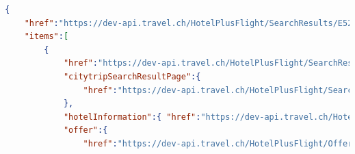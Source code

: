 \begin{lstlisting}[language=json,firstnumber=1]
{
    "href":"https://dev-api.travel.ch/HotelPlusFlight/SearchResults/E5241069-1272-4DD0-946E-46DD2E9D55E6",
    "items":[
        {
            "href":"https://dev-api.travel.ch/HotelPlusFlight/SearchResult/21ca65ff-976a-4a3e-bc92-b17608db3b25?pageId=58B8D81D-12B5-4EEE-9CE9-902CCDF01791",
            "citytripSearchResultPage":{
                "href":"https://dev-api.travel.ch/HotelPlusFlight/SearchResultPage/19E2B6BB-1F06-4396-B86E-169EDB368B0E?paging.offset=0&paging.size=12&sortMethod.type=https%3A%2F%2Fdev-api.travel.ch%2FSortType%2FPrice&ratings.minimal=0&ratings.maximal=100&hotelCategories%5B0%5D=https%3A%2F%2Fdev-api.travel.ch%2FHotelCategory%2FNone&hotelCategories%5B1%5D=https%3A%2F%2Fdev-api.travel.ch%2FHotelCategory%2FOne&hotelCategories%5B2%5D=https%3A%2F%2Fdev-api.travel.ch%2FHotelCategory%2FTwo&hotelCategories%5B3%5D=https%3A%2F%2Fdev-api.travel.ch%2FHotelCategory%2FThree&hotelCategories%5B4%5D=https%3A%2F%2Fdev-api.travel.ch%2FHotelCategory%2FFour&hotelCategories%5B5%5D=https%3A%2F%2Fdev-api.travel.ch%2FHotelCategory%2FFive&mealTypeCategories%5B0%5D=https%3A%2F%2Fdev-api.travel.ch%2FHotelMealTypeCategory%2FRoomOnly&mealTypeCategories%5B1%5D=https%3A%2F%2Fdev-api.travel.ch%2FHotelMealTypeCategory%2FBreakfast&mealTypeCategories%5B2%5D=https%3A%2F%2Fdev-api.travel.ch%2FHotelMealTypeCategory%2FHalfBoard&mealTypeCategories%5B3%5D=https%3A%2F%2Fdev-api.travel.ch%2FHotelMealTypeCategory%2FFullBoard&mealTypeCategories%5B4%5D=https%3A%2F%2Fdev-api.travel.ch%2FHotelMealTypeCategory%2FAllInclusive&luggageOptions%5B0%5D=https%3A%2F%2Fdev-api.travel.ch%2FLuggageOption%2FWithLuggage&luggageOptions%5B1%5D=https%3A%2F%2Fdev-api.travel.ch%2FLuggageOption%2FWithoutLuggage"
            },
            "hotelInformation":{ "href":"https://dev-api.travel.ch/HotelInformation/DDA48396-8105-433D-B75B-668F96EC89D8" },
            "offer":{
                "href":"https://dev-api.travel.ch/HotelPlusFlight/Offer?destination=https%3A%2F%2Fdev-api.travel.ch%2FDestination%2FH_63CA0931EAD8A33EF988144360A8056C&offerHotelInformation=https%3A%2F%2Fdev-api.travel.ch%2FHotelInformation%2FDDA48396-8105-433D-B75B-668F96EC89D8&hotelInformation=https%3A%2F%2Fdev-api.travel.ch%2FHotelInformation%2FDDA48396-8105-433D-B75B-668F96EC89D8&periodOfStay.checkInDate=2016-10-05&periodOfStay.checkOutDate=2016-10-08&roomOccupancies%5B0%5D.dateOfBirths%5B0%5D=null&roomOccupancies%5B0%5D.dateOfBirths%5B1%5D=null&departureAirports%5B0%5D=https%3A%2F%2Fdev-api.travel.ch%2FDestination%2FA6299722&mealTypeCategories%5B0%5D=https%3A%2F%2Fdev-api.travel.ch%2FHotelMealTypeCategory%2FRoomOnly&mealTypeCategories%5B1%5D=https%3A%2F%2Fdev-api.travel.ch%2FHotelMealTypeCategory%2FBreakfast&mealTypeCategories%5B2%5D=https%3A%2F%2Fdev-api.travel.ch%2FHotelMealTypeCategory%2FHalfBoard&mealTypeCategories%5B3%5D=https%3A%2F%2Fdev-api.travel.ch%2FHotelMealTypeCategory%2FFullBoard&mealTypeCategories%5B4%5D=https%3A%2F%2Fdev-api.travel.ch%2FHotelMealTypeCategory%2FAllInclusive&rooms%5B0%5D.HubBookingCode=BED-FHBB&flights%5B0%5D.HubId=2H&flights%5B1%5D.HubId=13&flights%5B0%5D.HubCode=ZRHTXL&flights%5B1%5D.HubCode=TXLZRH",

\end{lstlisting}
